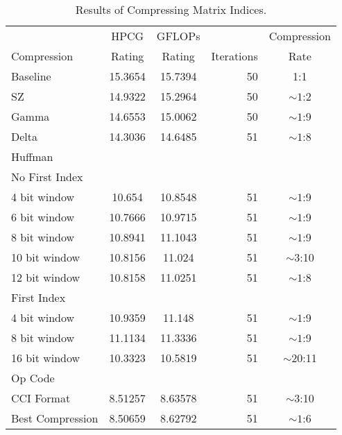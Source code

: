\begin{table}
	\centering
	\begin{tabular}{l|S[table-format=2.6]|S[table-format=2.6]|r|c}
		            & {HPCG}   & {GFLOPs} &            & Compression \\
		Compression & {Rating} & {Rating} & Iterations & Rate \\
		\hline
		Baseline & 15.3654 & 15.7394 & 50 & 1:1 \\ %
		SZ & 14.9322 & 15.2964 & 50 & \({\sim}1\):2 \\
		Gamma & 14.6553 & 15.0062 & 50 & \({\sim}1\):9 \\
		Delta & 14.3036 & 14.6485 & 51 & \({\sim}1\):8 \\
		Huffman & & & & \\
		\hspace{3mm}No First Index & & & & \\
			\hspace{6mm}4 bit window & 10.654 & 10.8548 & 51 & \({\sim}1\):9 \\
			\hspace{6mm}6 bit window & 10.7666 & 10.9715 & 51 &  \({\sim}1\):9 \\
			\hspace{6mm}8 bit window & 10.8941 & 11.1043 & 51 & \({\sim}1\):9 \\
			\hspace{6mm}10 bit window & 10.8156 & 11.024 & 51 & \({\sim}3\):10 \\
			\hspace{6mm}12 bit window & 10.8158 & 11.0251 & 51 & \({\sim}1\):8 \\
		\hspace{3mm}First Index & & & & \\
			\hspace{6mm}4 bit window & 10.9359 & 11.148 & 51 & \({\sim}1\):9 \\
			\hspace{6mm}8 bit window & 11.1134 & 11.3336 & 51 & \({\sim}1\):9 \\
			\hspace{6mm}16 bit window & 10.3323 & 10.5819 & 51 & \({\sim}20\):11 \\
		Op Code & & & & \\
		\hspace{3mm}CCI Format~\cite{Lawlor:2013:compression} & 8.51257 & 8.63578 & 51 & \({\sim}3\):10 \\
		\hspace{3mm}Best Compression & 8.50659 & 8.62792 & 51 & \({\sim}1\):6 \\
	\end{tabular}
	\caption{Results of Compressing Matrix Indices.}
	\label{tab:results-ind}
\end{table}